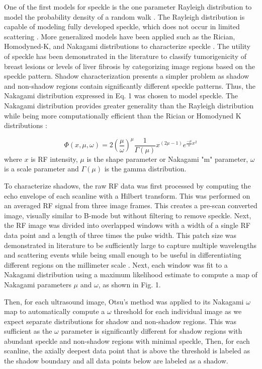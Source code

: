 \documentclass[authoryear,preprint,review,12pt]{elsarticle}
\begin{document}
One of the first models for speckle is the one parameter Rayleigh distribution to model the probability density of a random walk \citep{Burckhardt1978}. The Rayleigh distribution is capable of modeling fully developed speckle, which does not occur in limited scattering \citep{Tuthill1988}. More generalized models have been applied such as the Rician, Homodyned-K, and Nakagami distributions to characterize speckle \citep{Destrempes2010}. The utility of speckle has been demonstrated in the literature to classify tumorigenicity of breast lesions \citep{Byra2016} or levels of liver fibrosis \citep{Ho2012} by categorizing image regions based on the speckle pattern. Shadow characterization presents a simpler problem as shadow and non-shadow regions contain significantly different speckle patterns. Thus, the Nakagami distribution expressed in Eq. 1 was chosen to model speckle. The Nakagami distribution provides greater generality than the Rayleigh distribution while being more computationally efficient than the Rician or Homodyned K distributions \citep{Destrempes2010}:

\begin{equation}
\Phi(x,\mu,\omega) = 2(\frac{\mu}{\omega})^{\mu}\frac{1}{\Gamma(\mu)}x^{(2\mu-1)}e^{\frac{-\mu}{\omega}x^{2}}
\end{equation}where $x$ is RF intensity, $\mu$ is the shape parameter or Nakagami "m" parameter, $\omega$ is a scale parameter and $\Gamma(\mu)$ is the gamma distribution.

To characterize shadows, the raw RF data was first processed by computing the echo envelope of each scanline with a Hilbert transform. This was performed on an averaged RF signal from three image frames. This creates a pre-scan converted image, visually similar to B-mode but without filtering to remove speckle. Next, the RF image was divided into overlapped windows with a width of a single RF data point and a length of three times the pulse width. This patch size was demonstrated in literature to be sufficiently large to capture multiple wavelengths and scattering events while being small enough to be useful in differentiating different regions on the millimeter scale \citep{Byra2016}. Next, each window was fit to a Nakagami distribution using a maximum likelihood estimate to compute a map of Nakagami parameters $\mu$ and $\omega$, as shown in Fig. 1.

Then, for each ultrasound image, Otsu’s method was applied to its Nakagami $\omega$ map to automatically compute a $\omega$ threshold for each individual image as we expect separate distributions for shadow and non-shadow regions. This was sufficient as the $\omega$ parameter is significantly different for shadow regions with abundant speckle and non-shadow regions with minimal speckle, Then, for each scanline, the axially deepest data point that is above the threshold is labeled as the shadow boundary and all data points below are labeled as a shadow.
\end{document}
